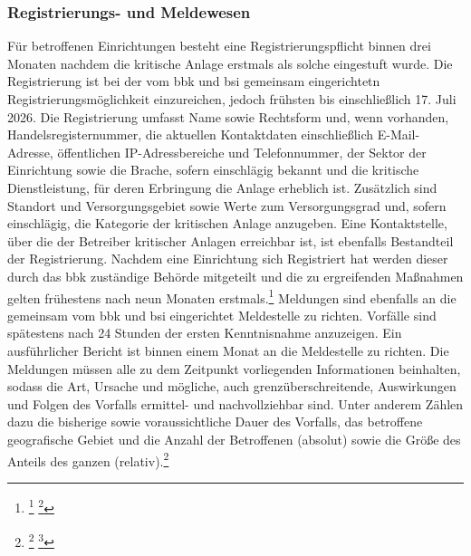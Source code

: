 \documentclass[11pt,a4paper,hidelinks]{article}   %
\begin{document}
                \subsubsection{Registrierungs- und Meldewesen}
                Für betroffenen Einrichtungen besteht eine Registrierungspflicht binnen drei Monaten nachdem die kritische Anlage erstmals als solche eingestuft wurde. Die Registrierung ist bei der vom \gls{bbk} und \gls{bsi} gemeinsam eingerichtetn Registrierungsmöglichkeit einzureichen, jedoch frühsten bis einschließlich 17. Juli 2026. Die Registrierung umfasst Name sowie Rechtsform und, wenn vorhanden, Handelsregisternummer, die aktuellen  Kontaktdaten einschließlich E-Mail-Adresse, öffentlichen IP-Adressbereiche und Telefonnummer, der Sektor der Einrichtung sowie die Brache, sofern einschlägig bekannt und die kritische Dienstleistung, für deren Erbringung die Anlage erheblich ist. Zusätzlich sind Standort und Versorgungsgebiet sowie  Werte zum Versorgungsgrad und, sofern einschlägig, die Kategorie der kritischen Anlage anzugeben. Eine Kontaktstelle, über die der Betreiber kritischer Anlagen erreichbar ist, ist ebenfalls Bestandteil der Registrierung. Nachdem eine Einrichtung sich Registriert hat werden dieser durch das \gls{bbk} zuständige Behörde mitgeteilt und die zu ergreifenden Maßnahmen gelten frühestens nach neun Monaten erstmals.\footnote{
                    \footcite[Vgl. §5, Absatz 1,][]{KRITIS-DachG}
                    \footcite[Vgl. §8,][]{KRITIS-DachG}
                }
                Meldungen sind ebenfalls an die gemeinsam vom \gls{bbk} und \gls{bsi} eingerichtet Meldestelle zu richten. Vorfälle sind spätestens nach 24 Stunden der ersten Kenntnisnahme anzuzeigen. Ein ausführlicher Bericht ist binnen einem Monat an die Meldestelle zu richten. Die Meldungen müssen alle zu dem Zeitpunkt vorliegenden Informationen beinhalten, sodass die Art, Ursache und mögliche, auch grenzüberschreitende, Auswirkungen und Folgen des Vorfalls ermittel- und nachvollziehbar sind. Unter anderem Zählen dazu die bisherige sowie voraussichtliche Dauer des Vorfalls, das betroffene geografische Gebiet und die Anzahl der Betroffenen (absolut) sowie die Größe des Anteils des ganzen (relativ).\footnote{
                    \footcite[Vgl. §18,][]{KRITIS-DachG}
                    \footcite[Vgl. §32, Absatz 1,][]{NIS2UmsuCG}
                }
\end{document}

